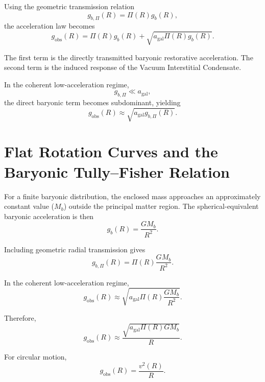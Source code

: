 Using the geometric transmission relation
\begin{equation}
    g_{b,\Pi}(R) = \Pi(R)g_b(R),
\end{equation}
the acceleration law becomes
\begin{equation}
    g_{\mathrm{obs}}(R) = \Pi(R)g_b(R) + \sqrt{ a_{\mathrm{gal}}\Pi(R)g_b(R) }.
\end{equation}

The first term is the directly transmitted baryonic restorative acceleration. The second term is the induced response of the Vacuum Interstitial Condensate.

In the coherent low-acceleration regime,
\begin{equation}
    g_{b,\Pi} \ll a_{\mathrm{gal}},
\end{equation}
the direct baryonic term becomes subdominant, yielding
\begin{equation}
    g_{\mathrm{obs}}(R) \approx \sqrt{ a_{\mathrm{gal}}g_{b,\Pi}(R) }.
\end{equation}

\section{Flat Rotation Curves and the Baryonic Tully--Fisher Relation}

For a finite baryonic distribution, the enclosed mass approaches an approximately constant value ($M_b$) outside the principal matter region. The spherical-equivalent baryonic acceleration is then
\begin{equation}
    g_b(R) = \frac{GM_b}{R^2}.
\end{equation}

Including geometric radial transmission gives
\begin{equation}
    g_{b,\Pi}(R) = \Pi(R) \frac{GM_b}{R^2}.
\end{equation}

In the coherent low-acceleration regime,
\begin{equation}
    g_{\mathrm{obs}}(R) \approx \sqrt{ a_{\mathrm{gal}} \Pi(R) \frac{GM_b}{R^2} }.
\end{equation}

Therefore,
\begin{equation}
    g_{\mathrm{obs}}(R) \approx \frac{ \sqrt{ a_{\mathrm{gal}}\Pi(R)GM_b } }{R}.
\end{equation}

For circular motion,
\begin{equation}
    g_{\mathrm{obs}}(R) = \frac{v^2(R)}{R}.
\end{equation}

